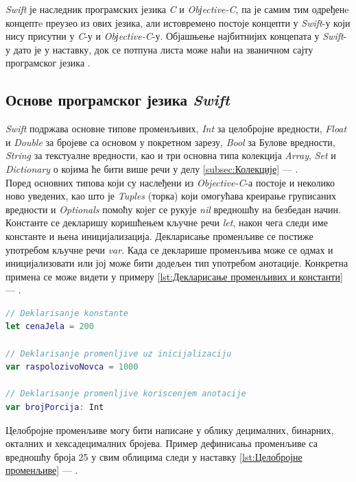 \documentclass[12pt,oneside]{memoir}
\begin{document}
\indent \textit{Swift} је наследник програмских језика \textit{C} и \textit{Obјective-C}, па је самим тим одређенe концептe преузео из ових језика, али истовремено постоје концепти у \textit{Swift}-у који нису присутни у \textit{C}-у и \textit{Obјective-C}-у. Објашњење најбитнијих концепата у \textit{Swift}-у дато је у наставку, док се потпуна листа може наћи на званичном сајту програмског језика \cite{SwiftOfficialSite}.

\subsection{Основе програмског језика \textit{Swift}}

\indent \textit{Swift} подржава основне типове променљивих, \textit{Int} за целобројне вредности, \textit{Float} и \textit{Double} за бројеве са основом у покретном зарезу, \textit{Bool} за Булове вредности, \textit{String} за текстуалне вредности, као и три основна типа колекција \textit{Array}, \textit{Set} и \textit{Dictionary} о којима ће бити више речи у делу \ref{subsec:Колекције} --- . 
\\ 
\indent Поред основних типова који су наслеђени из \textit{Objective-C}-а постоје и неколико ново уведених, као што је \textit{Tuples} (торка) који омогућава креирање груписаних вредности и \textit{Optionals} помоћу којег се рукује \textit{nil} вредношћу на безбедан начин.
\\
\indent Константе се декларишу коришћењем кључне речи \textit{let}, након чега следи име константе и њена иницијализација. Декларисање променљиве се постиже употребом кључне речи \textit{var}. Када се декларише променљива може се одмах и иницијализовати или јој може бити додељен тип употребом анотације. Конкретна примена се може видети у примеру \ref{lst:Декларисање променљивих и константи} --- .

\begin{lstlisting}[caption=\textit{Декларисање променљивих и константи}, label={lst:Декларисање променљивих и константи}, language=Swift, frame=single]
// Deklarisanje konstante
let cenaJela = 200

// Deklarisanje promenljive uz inicijalizaciju
var raspolozivoNovca = 1000

// Deklarisanje promenljive koriscenjem anotacije
var brojPorcija: Int
\end{lstlisting}

\indent Целобројне променљиве могу бити написане у облику децималних, бинарних, окталних и хексадецималних бројева. Пример дефинисања променљиве са вредношћу броја 25 у свим облицима следи у наставку \ref{lst:Целобројне променљиве} --- .
\end{document}
